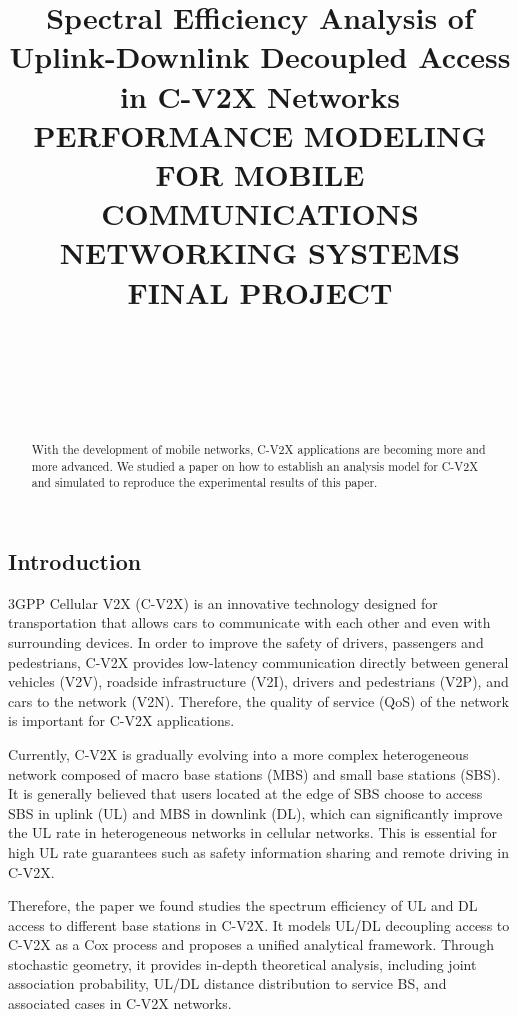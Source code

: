 \documentclass[conference]{IEEEtran}
\begin{document}
\begin{CJK*}{UTF8}{bsmi}

\title{Spectral Efficiency Analysis of Uplink-Downlink Decoupled Access in C-V2X Networks\\
{\normalsize {PERFORMANCE MODELING FOR MOBILE COMMUNICATIONS NETWORKING SYSTEMS FINAL PROJECT}}}

\author{
\\
\and
{}
\\
\and
{}
\\
}

\maketitle

\begin{abstract}
With the development of mobile networks, C-V2X applications are becoming more and more advanced. We studied a paper on how to establish an analysis model for C-V2X and simulated to reproduce the experimental results of this paper.
\end{abstract}
\section{Introduction}
\par 3GPP Cellular V2X (C-V2X) is an innovative technology designed for transportation that allows cars to communicate with each other and even with surrounding devices. In order to improve the safety of drivers, passengers and pedestrians, C-V2X provides low-latency communication directly between general vehicles (V2V), roadside infrastructure (V2I), drivers and pedestrians (V2P), and cars to the network (V2N). Therefore, the quality of service (QoS) of the network is important for C-V2X applications. 
\par Currently, C-V2X is gradually evolving into a more complex heterogeneous network composed of macro base stations (MBS) and small base stations (SBS). It is generally believed that users located at the edge of SBS choose to access SBS in uplink (UL) and MBS in downlink (DL), which can significantly improve the UL rate in heterogeneous networks in cellular networks. This is essential for high UL rate guarantees such as safety information sharing and remote driving in C-V2X. 
\par Therefore, the paper we found studies the spectrum efficiency of UL and DL access to different base stations in C-V2X. It models UL/DL decoupling access to C-V2X as a Cox process and proposes a unified analytical framework. Through stochastic geometry, it provides in-depth theoretical analysis, including joint association probability, UL/DL distance distribution to service BS, and associated cases in C-V2X networks.



\end{CJK*}
\end{document}
